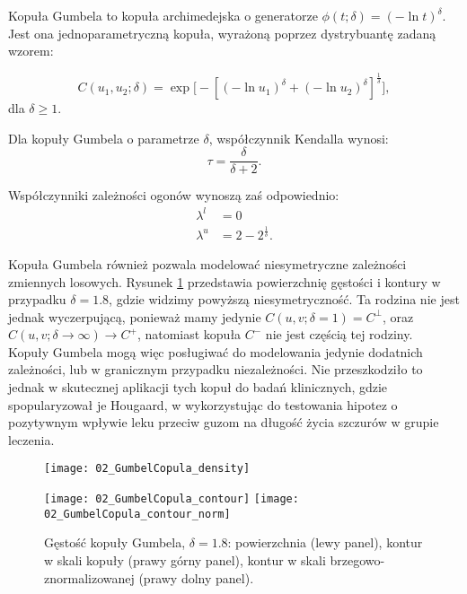 \begin{df}
	Kopuła Gumbela to kopuła archimedejska o generatorze $\phi(t;\delta) = (-\ln t)^{\delta}$. Jest ona jednoparametryczną kopuła, wyrażoną poprzez dystrybuantę zadaną wzorem:
	
	$$ C(u_1, u_2; \delta) = \exp\big[-[(-\ln u_1)^\delta+(-\ln u_2)^\delta]^{\frac{1}{\delta}}\big],$$
	dla $\delta \geqslant 1.$
\end{df}
\begin{prop}
	Dla kopuły Gumbela o parametrze $\delta$, współczynnik Kendalla wynosi:
	$$ \tau = \frac{\delta}{\delta + 2}.$$
	
	Współczynniki zależności ogonów wynoszą zaś odpowiednio:
	\begin{equation}
		\begin{split}
			\lambda^{l}&=0\\
			\lambda^{u}&=2 - 2^{\frac{1}{\delta}}.
		\end{split}
	\end{equation}
\end{prop}
Kopuła Gumbela również pozwala modelować niesymetryczne zależności zmiennych losowych.  Rysunek \ref{fig:gumbel_copula_density} przedstawia powierzchnię gęstości i kontury w przypadku $\delta = 1.8$, gdzie widzimy powyższą niesymetryczność. Ta rodzina nie jest jednak wyczerpującą, ponieważ mamy jedynie $C(u,v;\delta = 1) = C^{\perp}$, oraz $C(u,v;\delta \to \infty) \to C^{+}$, natomiast kopuła $C^{-}$ nie jest częścią tej rodziny. \\
Kopuły Gumbela mogą więc posługiwać do modelowania jedynie dodatnich zależności, lub w granicznym przypadku niezależności. Nie przeszkodziło to jednak w skutecznej aplikacji tych kopuł do badań klinicznych, gdzie spopularyzował je Hougaard, w \cite{Hougaard1986} wykorzystując do testowania hipotez o pozytywnym wpływie leku przeciw guzom na długość życia szczurów w grupie leczenia.

\begin{figure}[h]
	\centering
	\begin{minipage}{0.5\linewidth}
		\texttt{[image: 02\_GumbelCopula\_density]}
	\end{minipage}
	\begin{minipage}{0.45\linewidth}
		\texttt{[image: 02\_GumbelCopula\_contour]}
		\texttt{[image: 02\_GumbelCopula\_contour\_norm]}
	\end{minipage}
	\caption{Gęstość kopuły Gumbela, $\delta = 1.8$: powierzchnia (lewy panel), kontur w skali kopuły (prawy górny panel), kontur w skali brzegowo-znormalizowanej (prawy dolny panel). \label{fig:gumbel_copula_density}}
\end{figure}

